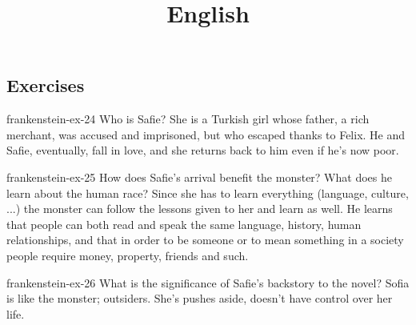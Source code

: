 \documentclass[preview]{standalone}
\begin{document}
\title{English}
\genpage

\subsection{Exercises}

\begin{snippetexercise}{frankenstein-ex-24}
    {Who is Safie?}
    She is a Turkish girl whose father, a rich merchant, was accused and
    imprisoned, but who escaped thanks to Felix.
    He and Safie, eventually, fall in love, 
    and she returns back to him even if he's now poor.
\end{snippetexercise}

\begin{snippetexercise}{frankenstein-ex-25}
    {How does Safie's arrival benefit the monster? What does he learn about the human race?}
    Since she has to learn everything (language, culture, ...)
    the monster can follow the lessons given to her and learn as well.
    He learns that people can both read and speak the same language,
    history, human relationships,
    and that in order to be someone or to mean something in a society
    people require money, property, friends and such.
\end{snippetexercise}

\begin{snippetexercise}{frankenstein-ex-26}
    {What is the significance of Safie's backstory to the novel?}
    Sofia is like the monster; outsiders.
    She's pushes aside, doesn't have control over her life.
\end{snippetexercise}
\end{document}
